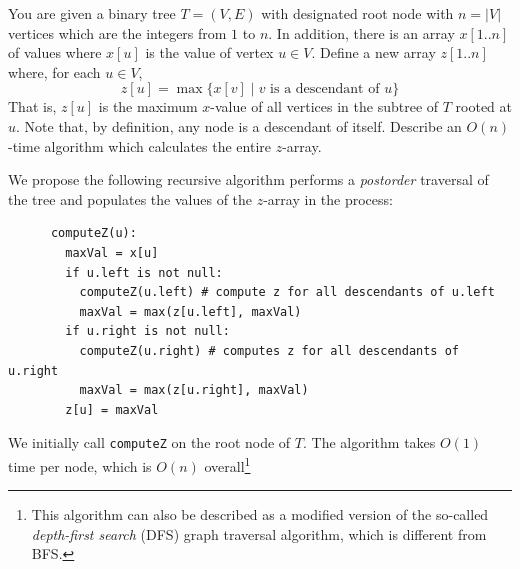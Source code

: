   \begin{exercise}[DPV 3.19]
    You are given a binary tree $T = (V, E)$ with designated root node with $n = |V|$ vertices which are the integers from $1$ to $n$. In addition, there is an array $x[1..n]$ of values where $x[u]$ is the value of vertex $u \in V$. Define a new array $z[1..n]$ where, for each $u \in V$,	
    \begin{equation}
      z[u] = \max \{ x[v] \mid \text{$v$ is a descendant of $u$}\}
    \end{equation}
    That is, $z[u]$ is the maximum $x$-value of all vertices in the subtree of $T$ rooted at $u$. Note that, by definition, any node is a descendant of itself. Describe an $O(n)$-time algorithm which calculates the entire $z$-array.
  \end{exercise}
  \begin{solution}
    We propose the following recursive algorithm performs a \emph{postorder} traversal of the tree and populates the values of the $z$-array in the process:
    \begin{lstlisting}
      computeZ(u):
        maxVal = x[u]
        if u.left is not null:
          computeZ(u.left) # compute z for all descendants of u.left
          maxVal = max(z[u.left], maxVal)
        if u.right is not null:
          computeZ(u.right) # computes z for all descendants of u.right
          maxVal = max(z[u.right], maxVal)
        z[u] = maxVal
    \end{lstlisting}
    We initially call \texttt{computeZ} on the root node of $T$.        The algorithm takes $O(1)$ time per node, which is $O(n)$ overall\footnote{This algorithm can also be described as a modified version of the so-called \emph{depth-first search} (DFS) graph traversal algorithm, which is different from BFS.}
  \end{solution}

